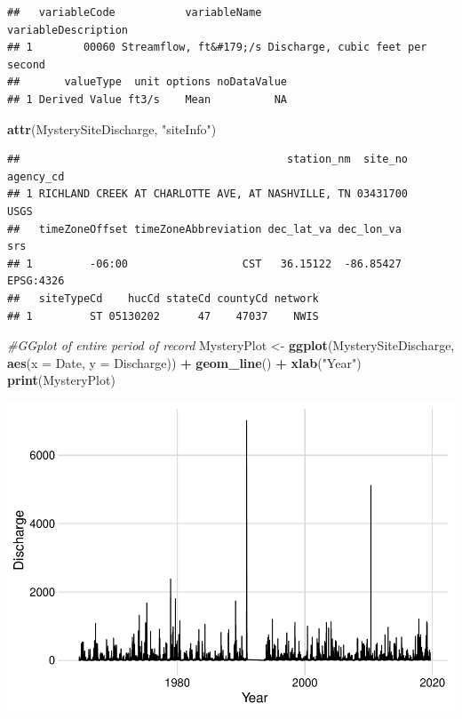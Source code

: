 \documentclass[]{article}
\newenvironment{Shaded}{\begin{snugshade}}{\end{snugshade}}
\newcommand{\CommentTok}[1]{\textcolor[rgb]{0.56,0.35,0.01}{\textit{#1}}}
\newcommand{\DataTypeTok}[1]{\textcolor[rgb]{0.13,0.29,0.53}{#1}}
\newcommand{\KeywordTok}[1]{\textcolor[rgb]{0.13,0.29,0.53}{\textbf{#1}}}
\newcommand{\NormalTok}[1]{#1}
\newcommand{\OperatorTok}[1]{\textcolor[rgb]{0.81,0.36,0.00}{\textbf{#1}}}
\newcommand{\StringTok}[1]{\textcolor[rgb]{0.31,0.60,0.02}{#1}}
\begin{document}
\begin{verbatim}
##   variableCode           variableName              variableDescription
## 1        00060 Streamflow, ft&#179;/s Discharge, cubic feet per second
##       valueType  unit options noDataValue
## 1 Derived Value ft3/s    Mean          NA
\end{verbatim}

\begin{Shaded}
\begin{Highlighting}[]
\KeywordTok{attr}\NormalTok{(MysterySiteDischarge, }\StringTok{"siteInfo"}\NormalTok{)}
\end{Highlighting}
\end{Shaded}

\begin{verbatim}
##                                          station_nm  site_no agency_cd
## 1 RICHLAND CREEK AT CHARLOTTE AVE, AT NASHVILLE, TN 03431700      USGS
##   timeZoneOffset timeZoneAbbreviation dec_lat_va dec_lon_va       srs
## 1         -06:00                  CST   36.15122  -86.85427 EPSG:4326
##   siteTypeCd    hucCd stateCd countyCd network
## 1         ST 05130202      47    47037    NWIS
\end{verbatim}

\begin{Shaded}
\begin{Highlighting}[]
\CommentTok{#GGplot of entire period of record}
\NormalTok{MysteryPlot <-}
\StringTok{  }\KeywordTok{ggplot}\NormalTok{(MysterySiteDischarge, }\KeywordTok{aes}\NormalTok{(}\DataTypeTok{x =}\NormalTok{ Date, }\DataTypeTok{y =}\NormalTok{ Discharge)) }\OperatorTok{+}
\StringTok{  }\KeywordTok{geom_line}\NormalTok{() }\OperatorTok{+}
\StringTok{  }\KeywordTok{xlab}\NormalTok{(}\StringTok{"Year"}\NormalTok{)}
\KeywordTok{print}\NormalTok{(MysteryPlot)}
\end{Highlighting}
\end{Shaded}

\includegraphics{Cai_A03_RiversPhysical_files/figure-latex/unnamed-chunk-1-1.pdf}
\end{document}
